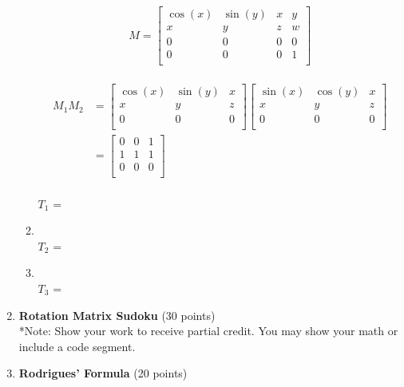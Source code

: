 \documentclass{article}
\begin{document}
\begin{enumerate}
\begin{enumerate}
    \[M = \begin{bmatrix}
    \cos(x) & \sin(y) & x & y\\
    x & y & z & w\\
    0 & 0 & 0 & 0\\
    0 & 0 & 0 & 1\\
    \end{bmatrix}\]\\
    \begin{align*}
        M_{1} M_{2} &= \begin{bmatrix}
                    \cos(x) & \sin(y) & x \\
                    x & y & z \\
                    0 & 0 & 0 \\
                    \end{bmatrix}
                    \begin{bmatrix}
                    \sin(x) & \cos(y) & x \\
                    x & y & z \\
                    0 & 0 & 0 \\
                    \end{bmatrix}\\
                    &= \begin{bmatrix}
                    0 & 0 & 1 \\
                    1 & 1 & 1 \\
                    0 & 0 & 0 \\
                    \end{bmatrix}
    \end{align*}\\

    $T_1$ = 
    
    \item
    \\
    $T_2$ = 

    
    \item
    \\
    $T_3$ = 
    
\end{enumerate}



\item \textbf{Rotation Matrix Sudoku} (30 points)
\\
*Note: Show your work to receive partial credit. You may show your math or include a code segment. 


\item \textbf{Rodrigues' Formula} (20 points)


\end{enumerate}
\end{document}
